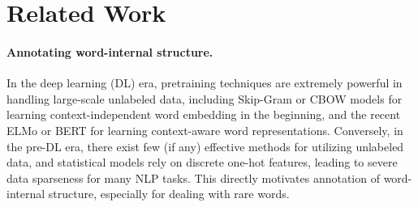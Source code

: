 \section{Related Work}\label{sec:related-work}






\paragraph{Annotating word-internal structure.}%

In the deep learning (DL) era, pretraining techniques are extremely powerful in handling large-scale unlabeled data, including Skip-Gram or CBOW models \cite{mikolov2013efficient} for learning context-independent word embedding in the beginning, and the recent ELMo \cite{peters2018deep} or BERT \cite{devlin-2019-bert} for learning context-aware word representations. 
Conversely, in the pre-DL era, there exist few (if any) effective methods for utilizing unlabeled data, and statistical models rely on discrete one-hot features, leading to severe data sparseness for many NLP tasks. This directly motivates annotation of word-internal structure, especially for dealing with rare words. 

